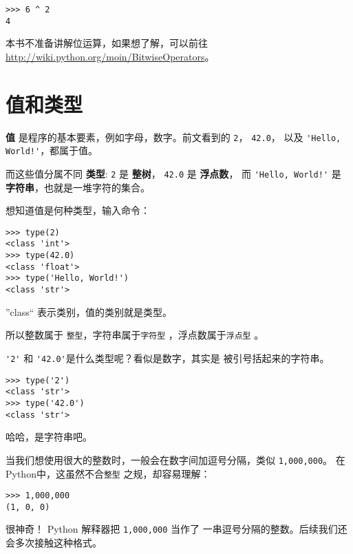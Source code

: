\documentclass[10pt]{book}
\begin{document}
\begin{verbatim}
>>> 6 ^ 2
4
\end{verbatim}
%

本书不准备讲解位运算，如果想了解，可以前往  
\url{http://wiki.python.org/moin/BitwiseOperators}。


\section{值和类型}


 {\bf 值} 是程序的基本要素，例如字母，数字。前文看到的
 {\tt 2}， {\tt 42.0}， 以及  \verb"'Hello, World!'"，都属于值。

而这些值分属不同 {\bf 类型}:
{\tt 2} 是 {\bf 整树}，
{\tt 42.0} 是 {\bf 浮点数}， 
而 \verb"'Hello, World!'" 是 {\bf 字符串}，也就是一堆字符的集合。

想知道值是何种类型，输入命令：

\begin{verbatim}
>>> type(2)
<class 'int'>
>>> type(42.0)
<class 'float'>
>>> type('Hello, World!')
<class 'str'>
\end{verbatim}
%

”class“ 表示类别，值的类别就是类型。


所以整数属于 {\tt 整型}，字符串属于{\tt 字符型} ，浮点数属于{\tt 浮点型} 。

 \verb"'2'" 和 \verb"'42.0'"是什么类型呢？看似是数字，其实是
被引号括起来的字符串。

\begin{verbatim}
>>> type('2')
<class 'str'>
>>> type('42.0')
<class 'str'>
\end{verbatim}
%
哈哈，是字符串吧。

当我们想使用很大的整数时，一般会在数字间加逗号分隔，类似 {\tt 1,000,000}。
在Python中，这虽然不合{\tt 整型} 之规，却容易理解：

\begin{verbatim}
>>> 1,000,000
(1, 0, 0)
\end{verbatim}
%

很神奇！ Python 解释器把 {\tt 1,000,000} 当作了
一串逗号分隔的整数。后续我们还会多次接触这种格式。

\end{document}
